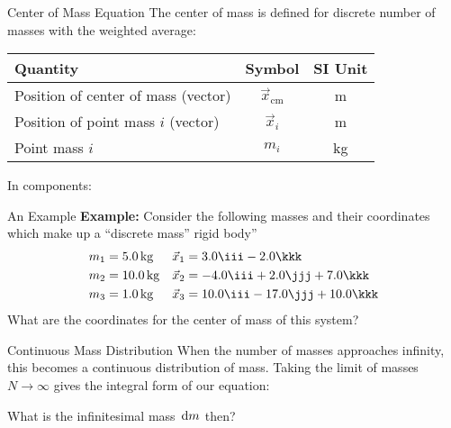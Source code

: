 \documentclass[12pt,compress,aspectratio=169]{beamer}
\begin{document}
\begin{frame}{Center of Mass Equation}
  The center of mass is defined for discrete number of masses with the weighted
  average:

  \begin{center}
    \begin{tabular}{l|c|c}
      \rowcolor{pink}
      \textbf{Quantity} & \textbf{Symbol} & \textbf{SI Unit} \\ \hline
      Position of center of mass (vector) & $\vec x_\text{cm}$ & \si\metre \\
      Position of point mass $i$ (vector) & $\vec x_i$ & \si\metre \\
      Point mass $i$ & $m_i$ & \si{\kilo\gram}
    \end{tabular}
  \end{center}
  In components:

\end{frame}



\begin{frame}{An Example}
  \textbf{Example:} Consider the following masses and their coordinates
  which make up a ``discrete mass'' rigid body''
  \begin{align*}
    m_1&=\SI{5.0}{\kg} &\vec x_1&=3.0\iii-2.0\kkk\\
    m_2&=\SI{10.0}{\kg}&\vec x_2&=-4.0\iii+2.0\jjj+7.0\kkk\\
    m_3&=\SI{1.0}{\kg}&\vec x_3&=10.0\iii-17.0\jjj+10.0\kkk
  \end{align*}
  What are the coordinates for the center of mass of this system?
\end{frame}



\begin{frame}{Continuous Mass Distribution}
  When the number of masses approaches infinity, this becomes a continuous
  distribution of mass. Taking the limit of masses $N\rightarrow\infty$ gives
  the integral form of our equation:


  What is the infinitesimal mass $\dl m$ then?
\end{frame}
\end{document}
